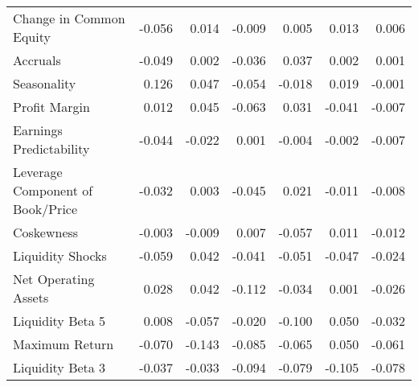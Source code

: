\begin{tabular}{lrrrrrr}
Change in Common Equity                    & -0.056 &  0.014 & -0.009 &  0.005 &  0.013 &  0.006 \\
Accruals                                   & -0.049 &  0.002 & -0.036 &  0.037 &  0.002 &  0.001 \\
Seasonality                                &  0.126 &  0.047 & -0.054 & -0.018 &  0.019 & -0.001 \\
Profit Margin                              &  0.012 &  0.045 & -0.063 &  0.031 & -0.041 & -0.007 \\
Earnings Predictability                    & -0.044 & -0.022 &  0.001 & -0.004 & -0.002 & -0.007 \\
Leverage Component of Book/Price           & -0.032 &  0.003 & -0.045 &  0.021 & -0.011 & -0.008 \\
Coskewness                                 & -0.003 & -0.009 &  0.007 & -0.057 &  0.011 & -0.012 \\
Liquidity Shocks                           & -0.059 &  0.042 & -0.041 & -0.051 & -0.047 & -0.024 \\
Net Operating Assets                       &  0.028 &  0.042 & -0.112 & -0.034 &  0.001 & -0.026 \\
Liquidity Beta 5                           &  0.008 & -0.057 & -0.020 & -0.100 &  0.050 & -0.032 \\
Maximum Return                             & -0.070 & -0.143 & -0.085 & -0.065 &  0.050 & -0.061 \\
Liquidity Beta 3                           & -0.037 & -0.033 & -0.094 & -0.079 & -0.105 & -0.078 \\
\bottomrule
\end{tabular}
